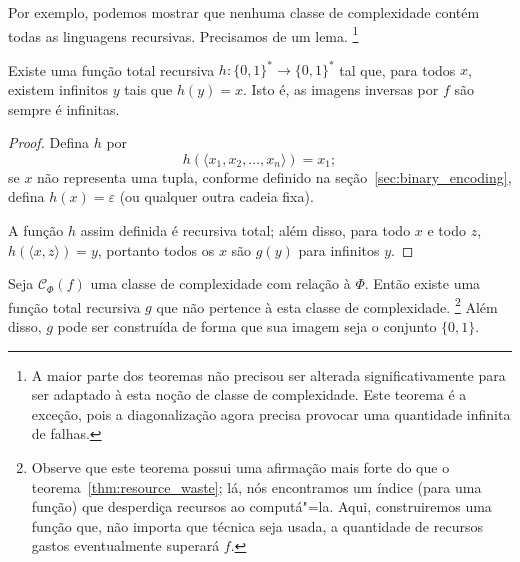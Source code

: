 Por exemplo,
podemos mostrar que
nenhuma classe de complexidade contém todas as linguagens recursivas.
Precisamos de um lema.%
\footnote{
    A maior parte dos teoremas não precisou ser alterada significativamente
    para ser adaptado à esta noção de classe de complexidade.
    Este teorema é a exceção,
    pois a diagonalização agora precisa provocar uma quantidade infinita de falhas.
}

\begin{lemma}
    Existe uma função total recursiva $h: \{0, 1\}^* \to \{0, 1\}^*$
    tal que, para todos $x$,
    existem infinitos $y$ tais que $h(y) = x$.
    Isto é, as imagens inversas por $f$ são sempre é infinitas.
\end{lemma}

\begin{proof}
    Defina $h$ por
    \begin{equation*}
        h( \langle x_1, x_2, \dots, x_n \rangle ) = x_1;
    \end{equation*}
    se $x$ não representa uma tupla,
    conforme definido na seção~\ref{sec:binary_encoding},
    defina $h(x) = \varepsilon$
    (ou qualquer outra cadeia fixa).

    A função $h$ assim definida é recursiva total;
    além disso, para todo $x$ e todo $z$,
    $h(\langle x, z \rangle) = y$,
    portanto todos os $x$ são $g(y)$ para infinitos $y$.
\end{proof}

\begin{theorem}
    Seja $\mathcal C_\Phi(f)$ uma classe de complexidade
    com relação à $\Phi$.
    Então existe uma função total recursiva $g$
    que não pertence à esta classe de complexidade.%
    \footnote{
        Observe que este teorema possui uma afirmação mais forte
        do que o teorema~\ref{thm:resource_waste};
        lá,
        nós encontramos um índice (para uma função)
        que desperdiça recursos ao computá"=la.
        Aqui,
        construiremos uma função que,
        não importa que técnica seja usada,
        a quantidade de recursos gastos eventualmente superará $f$.
    }
    Além disso, $g$ pode ser construída de forma que
    sua imagem seja o conjunto $\{0, 1\}$.
    \label{thm:outside_class}
\end{theorem}

